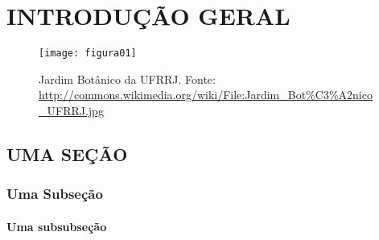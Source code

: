\artigofalse
\chapter{INTRODUÇÃO GERAL}
\label{chap:introduction}
\setcounter{page}{1}

\blindtext[2]

\begin{figure}[!ht]
\label{fig:jardim}
\centering
\texttt{[image: figura01]}
\caption[Jardim Botânico da UFRRJ.]{Jardim Botânico da UFRRJ. Fonte: 
\url{http://commons.wikimedia.org/wiki/File:Jardim_Bot\%C3\%A2nico_UFRRJ.jpg}}
\end{figure}

\blindtext[1]

\section{UMA SEÇÃO}

\blindtext[2]

\subsection{Uma Subseção}

\blindtext[2]

\subsubsection{Uma subsubseção}

\blindtext[2]
